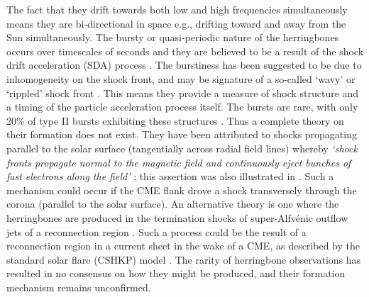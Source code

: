 The fact that they drift towards both low and high frequencies simultaneously means they are bi-directional in space e.g., drifting toward and away from the Sun simultaneously. The bursty or quasi-periodic nature of the herringbones occurs over timescales of seconds \citep{mann1995, mann2005} and they are believed to be a result of the shock drift acceleration (SDA) process \citep{miteva2007}. The burstiness has been suggested to be due to inhomogeneity on the shock front, and may be signature of a so-called `wavy' or `rippled' shock front \citep{zlobec1993, guo2010, vandas2011}. This means they provide a measure of shock structure and a timing of the particle acceleration process itself. The bursts are rare, with only 20\% of type II bursts exhibiting these structures \citep{cairns1987}. Thus a complete theory on their formation does not exist. They have been attributed to shocks propagating parallel to the solar surface (tangentially across radial field lines) whereby \emph{`shock fronts propagate normal to the magnetic field and continuously eject bunches of fast electrons along the field'} \citep{wild1964}; this assertion was also illustrated in \citet{stewart1980}. Such a mechanism could occur if the CME flank drove a shock transversely through the corona (parallel to the solar surface). An alternative theory is one where the herringbones are produced in the termination shocks of super-Alfv\'{e}nic outflow jets of a reconnection region \citep{aurass2002, aurass2004, mann2009}. Such a process could be the result of a reconnection region in a current sheet in the wake of a CME, as described by the standard solar flare (CSHKP) model \citep{carmicheal1964, sturrock1966, hirayama1974, kopp1976}. The rarity of herringbone observations has resulted in no consensus on how they might be produced, and their formation mechanism remains unconfirmed.
